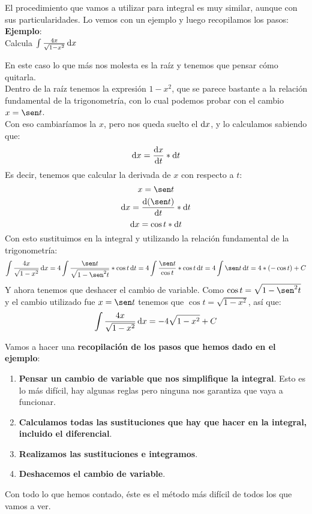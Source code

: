 \documentclass[a4paper,11pt,answers]{exam}
\begin{document}
El procedimiento que vamos a utilizar para integral es muy similar, aunque con sus particularidades. Lo vemos con un ejemplo y luego recopilamos los pasos:
\textbf{Ejemplo}:\\
Calcula $\int \frac{4x}{\sqrt{1 - x^2}}\,\mathrm{d}x$
\begin{solution}
En este caso lo que más nos molesta es la raíz y tenemos que pensar cómo quitarla.\\
Dentro de la raíz tenemos la expresión $1 - x^2$, que se parece bastante a la relación fundamental de la trigonometría, con lo cual podemos probar con el cambio $x = \sen t$.\\
Con eso cambiaríamos la $x$, pero nos queda suelto el $\mathrm{d}x$, y lo calculamos sabiendo que:
\[\mathrm{d}x = \frac{\mathrm{d}x}{\mathrm{d}t}*\mathrm{d}t\]
Es decir, tenemos que calcular la derivada de $x$ con respecto a $t$:
\[x= \sen t\]
\[\dif{x} = \frac{\dif{(\sen t)}}{\dif{t}}*\dif{t}\]
\[\mathrm{d}x = \cos t * \mathrm{d}t\]
Con esto sustituimos en la integral y utilizando la relación fundamental de la trigonometría:
\[\integral{\frac{4x}{\sqrt{1 - x^2}}}{x} = 4 \integral{\frac{\sen t}{\sqrt{1 - \sen^2 t}} *\cos t }{t} = 
4\integral{\frac{\sen t}{\cos t} * \cos t}{t} = 4\integral{\sen t}{t} = 4*(-\cos t) + C\]
Y ahora tenemos que deshacer el cambio de variable. Como $\cos t = \sqrt{1 - \sen^2 t}$ y el cambio utilizado fue $x= \sen t$ tenemos que $\cos t = \sqrt{1 - x^2}$, así que:
\[\int \frac{4x}{\sqrt{1 - x^2}}\,\mathrm{d}x = -4 \sqrt{1 - x^2} + C\]
\end{solution}

Vamos a hacer una \textbf{recopilación de los pasos que hemos dado en el ejemplo}:
\begin{enumerate}
	\item \textbf{Pensar un cambio de variable que nos simplifique la integral}. Esto es lo más difícil, hay algunas reglas pero ninguna nos garantiza que vaya a funcionar.
	\item \textbf{Calculamos todas las sustituciones que hay que hacer en la integral, incluido el diferencial}.
	\item \textbf{Realizamos las sustituciones e integramos}.
	\item \textbf{Deshacemos el cambio de variable}.
\end{enumerate}
Con todo lo que hemos contado, éste es el método más difícil de todos los que vamos a ver.
\end{document}
